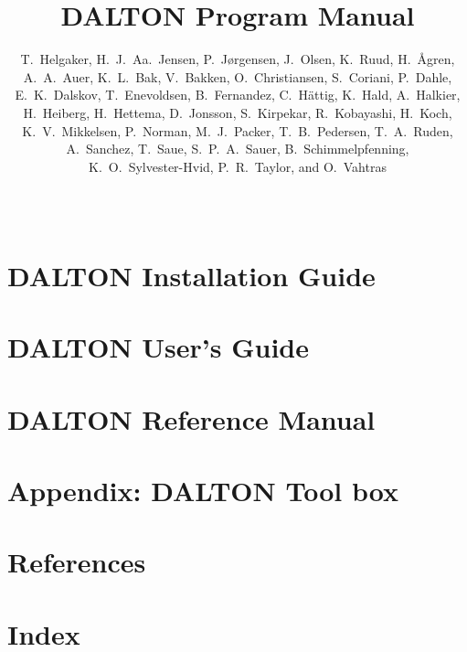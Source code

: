 \documentclass[11pt]{report}
\begin{document}
%

%
\baselineskip=15pt
%
\title{DALTON Program Manual}

%
\author{T.~Helgaker, H.~J.~Aa.~Jensen, P.~J{\o}rgensen, J.~Olsen,
K.~Ruud, H.~{\AA}gren,\smallskip\\ 
A.~A.~Auer,
K.~L.~Bak,
V.~Bakken,
O.~Christiansen,
S.~Coriani,
P.~Dahle,\\
E.~K.~Dalskov,
T.~Enevoldsen,
B.~Fernandez,
C.~H{\"a}ttig,
K.~Hald,
A.~Halkier,\\
H.~Heiberg,
H.~Hettema,
D.~Jonsson,
S.~Kirpekar,
R.~Kobayashi,
H.~Koch,\\
K.~V.~Mikkelsen,
P.~Norman,
M.~J.~Packer,
T.~B.~Pedersen,
T.~A.~Ruden,\\
A.~Sanchez,
T.~Saue,
S.~P.~A.~Sauer,
B.~Schimmelpfenning,\\
K.~O.~Sylvester-Hvid,
P.~R.~Taylor,
and O.~Vahtras}
%
\date{\mbox{\ }}
%
\maketitle
%



\part{DALTON Installation Guide}


\part{DALTON User's Guide}














\part{DALTON Reference Manual}






















\part{Appendix: DALTON Tool box}

\part{References}

%
\part{Index}
\printindex
\end{document}
